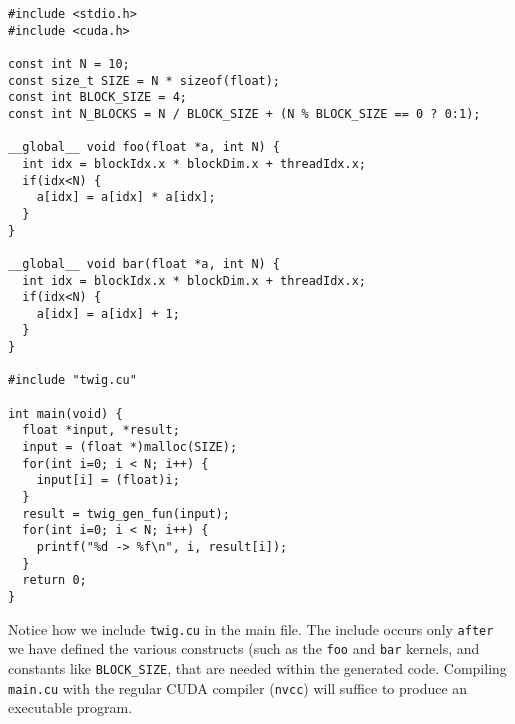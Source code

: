 \begin{verbatim}
#include <stdio.h>
#include <cuda.h>

const int N = 10;
const size_t SIZE = N * sizeof(float);
const int BLOCK_SIZE = 4;
const int N_BLOCKS = N / BLOCK_SIZE + (N % BLOCK_SIZE == 0 ? 0:1);

__global__ void foo(float *a, int N) {
  int idx = blockIdx.x * blockDim.x + threadIdx.x;
  if(idx<N) {
    a[idx] = a[idx] * a[idx];
  }
}

__global__ void bar(float *a, int N) {
  int idx = blockIdx.x * blockDim.x + threadIdx.x;
  if(idx<N) {
    a[idx] = a[idx] + 1;
  }
}

#include "twig.cu"

int main(void) {
  float *input, *result;
  input = (float *)malloc(SIZE);
  for(int i=0; i < N; i++) {
    input[i] = (float)i;
  }
  result = twig_gen_fun(input);
  for(int i=0; i < N; i++) {
    printf("%d -> %f\n", i, result[i]);
  }
  return 0;
}\end{verbatim}

Notice how we include \texttt{twig.cu} in the main file. The include occurs
only \texttt{after} we have defined the various constructs (such as the
\texttt{foo} and \texttt{bar} kernels, and constants like
\texttt{BLOCK\_SIZE}, that are needed within the generated code. Compiling
\texttt{main.cu} with the regular CUDA compiler (\texttt{nvcc}) will suffice
to produce an executable program.
